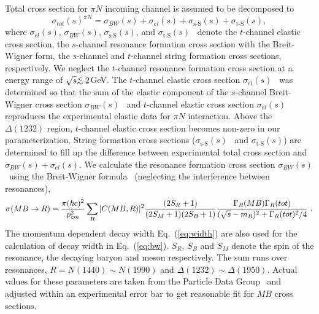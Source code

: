 \documentclass[]{article}
\newcommand{\sigtot}{\mbox{$\sigma_{tot}(s)$}}
\newcommand{\sigel}{\mbox{$\sigma_{el}(s)$}}
\newcommand{\sigtS}{\mbox{$\sigma_{\mbox{t-S}}(s)$}}
\newcommand{\sigbw}{\mbox{$\sigma_{BW}(s)$}}
\newcommand{\sigsS}{\mbox{$\sigma_{\mbox{s-S}}(s)$}}
\newcommand{\lsim}{\mbox{\raisebox{-0.6ex}{$\stackrel{<}{\sim}$}}\:}
\begin{document}
Total cross section for $\pi N$ incoming channel is assumed to be decomposed to
\begin{equation}
 \sigtot^{\pi N}=\sigbw+\sigel +\sigsS+\sigtS,
\end{equation}
%
where \sigel, \sigbw, \sigsS, and \sigtS~ denote
the $t$-channel elastic cross section,
the $s$-channel resonance formation cross section
	with the Breit-Wigner form, 
the $s$-channel and $t$-channel string formation cross sections, respectively.
We neglect the $t$-channel resonance formation cross section at a
  energy range of 
$\sqrt{s}\lsim 2$GeV.
%
The $t$-channel elastic cross section \sigel~ was determined so that
the sum of the elastic component of
 the $s$-channel Breit-Wigner cross section \sigbw~
 and $t$-channel elastic cross section \sigel~ 
reproduces the experimental elastic data for $\pi N$ interaction.
%
Above the $\Delta(1232)$ region, $t$-channel elastic cross section
becomes non-zero in our parameterization.
%
String formation cross sections (\sigsS~ and \sigtS) are 
 determined to fill up the difference between
 experimental total cross section and $\sigbw+\sigel$.
%
We calculate the resonance formation cross section \sigbw\ 
using the Breit-Wigner formula~\cite{Brown,rqmd1}
(neglecting the interference between resonances),
\begin{equation}
    \label{eq:bw}
\sigma(MB \to R)= {\pi(\hbar c)^2 \over p_{cm}^2}
         \sum_{R}  |C(MB,R)|^2  {(2S_R+1) \over (2S_M+1)(2S_B+1)}
                     {\Gamma_R(MB)\Gamma_R(tot) \over
                      (\sqrt{s}-m_R)^2+\Gamma_R(tot)^2/4} \ .
\end{equation}
The momentum dependent decay width
Eq.~(\ref{eq:width}) are also used for the calculation of
 decay width in Eq.~(\ref{eq:bw}).
$S_R$, $S_B$ and $S_M$ denote the spin of
 the resonance, the decaying baryon and meson respectively.
The sum runs over resonances,
   $R=N(1440)\sim N(1990)$ and $\Delta(1232)\sim\Delta(1950)$.
Actual values for these parameters are 
 taken from the Particle Data Group~\cite{PDG96}
 and adjusted
 within an experimental error bar
to get reasonable fit for $MB$ cross sections.
\end{document}

